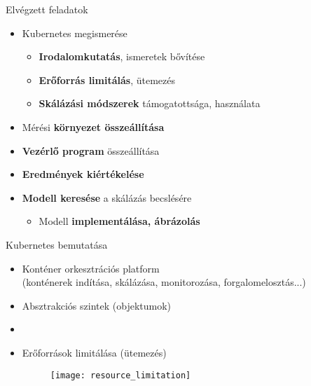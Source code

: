 \documentclass{beamer}
\begin{document}
\begin{frame}[t]{Elvégzett feladatok}
\begin{itemize}
\item<1-> Kubernetes megismerése
\begin{itemize}
	\item[] \textbf{Irodalomkutatás}, ismeretek bővítése
	\item[] \textbf{Erőforrás limitálás}, ütemezés
	\item[] \textbf{Skálázási módszerek} támogatottsága, használata
\end{itemize}
\item<1-> Mérési \textbf{környezet összeállítása}
\item<1-> \textbf{Vezérlő program} összeállítása
\item<1-> \textbf{Eredmények kiértékelése}
\item<1-> \textbf{Modell keresése} a skálázás becslésére
\begin{itemize}
	\item[] Modell \textbf{implementálása, ábrázolás} 
\end{itemize}
\end{itemize}
\end{frame}


\begin{frame}[t]{Kubernetes bemutatása}
\begin{itemize}
\item Konténer orkesztrációs platform \\ \footnotesize{(konténerek indítása, skálázása, monitorozása, forgalomelosztás...)} \normalsize
\item Absztrakciós szintek (objektumok) \\[1ex]
\item[] 
\item \raggedright Erőforrások limitálása (ütemezés)
\begin{figure}
	\centering
	\texttt{[image: resource\_limitation]}
\end{figure}
\end{itemize}
\end{frame}
\end{document}
